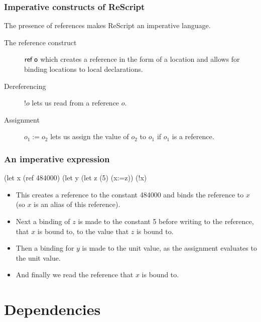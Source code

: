 \documentclass{beamer}
\begin{document}
\begin{frame}
  \frametitle{Imperative constructs of ReScript}
  
  The presence of references makes ReScript an imperative language.

  \begin{description}
    \item[The reference construct] $\textsf{ref\;o}$ which creates a reference in the form of a location and allows for binding locations to local declarations.

    \item[Dereferencing] $!o$ lets us read from a reference $o$.

    \item[Assignment] $o_1 := o_2$ lets us assign the value of $o_2$
      to $o_1$ if $o_1$ is a reference.
\end{description}


\end{frame}



\begin{frame}[fragile]
  \frametitle{An imperative expression}
  
\begin{rescript}
       (let x (ref 484000)
           (let y (let z (5)
               (x:=z)) (!x)
\end{rescript}
%
\begin{itemize}
\item<1->This creates a reference to the constant 484000 and binds the reference to
  $x$ (so $x$ is an alias of this reference).
\item<2-> Next a binding of $z$ is made
to the constant 5 before writing to the reference, that $x$ is bound to, 
to the value that $z$ is bound to.
\item<3-> Then a binding for $y$ is made to the unit value,
  as the assignment evaluates to the unit value.
\item<4-> And finally we read the reference that $x$ is bound to.
\end{itemize}

\end{frame}

\section{Dependencies}
\end{document}
